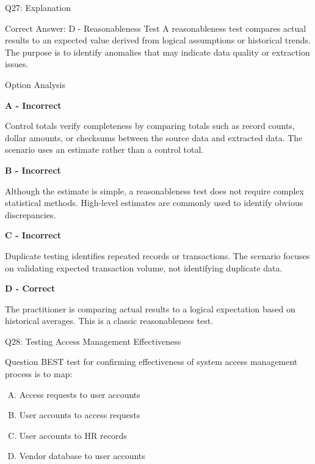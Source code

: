 \documentclass{beamer}
\begin{document}
	\begin{frame}[shrink=10]{Q27: Explanation}
		\footnotesize
		
		\begin{block}{Correct Answer: D - Reasonableness Test}
			A reasonableness test compares actual results to an expected
			value derived from logical assumptions or historical trends.
			The purpose is to identify anomalies that may indicate data
			quality or extraction issues.
		\end{block}
		
		\begin{block}{Option Analysis}
			
			\textbf{A - Incorrect}
			
			Control totals verify completeness by comparing totals such as
			record counts, dollar amounts, or checksums between the source
			data and extracted data. The scenario uses an estimate rather
			than a control total.
			
			\vspace{0.15cm}
			
			\textbf{B - Incorrect}
			
			Although the estimate is simple, a reasonableness test does not
			require complex statistical methods. High-level estimates are
			commonly used to identify obvious discrepancies.
			
			\vspace{0.15cm}
			
			\textbf{C - Incorrect}
			
			Duplicate testing identifies repeated records or transactions.
			The scenario focuses on validating expected transaction volume,
			not identifying duplicate data.
			
			\vspace{0.15cm}
			
			\textbf{D - Correct}
			
			The practitioner is comparing actual results to a logical
			expectation based on historical averages. This is a classic
			reasonableness test.
			
		\end{block}
	
		
	\end{frame}
	
	
	\begin{frame}{Q28: Testing Access Management Effectiveness}
		\begin{block}{Question}
			BEST test for confirming effectiveness of system access management process is to map:
		\end{block}
		\begin{enumerate}[(A)]
			\item Access requests to user accounts
			\item User accounts to access requests
			\item User accounts to HR records
			\item Vendor database to user accounts
		\end{enumerate}
	\end{frame}
	
\end{document}
